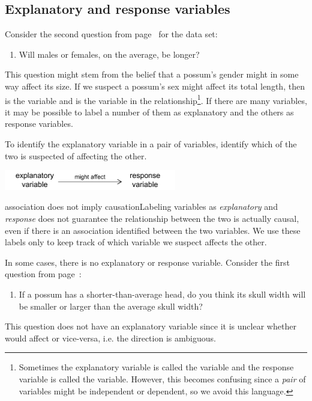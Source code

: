 \subsection{Explanatory and response variables}
\label{explanatoryAndResponse}

Consider the second question from page~\pageref{possibleCausationQuestionForPossums} for the  data set:
\begin{enumerate}
\item[(2)] Will males or females, on the average, be longer?
\end{enumerate}
This question might stem from the belief that a possum's gender might in some way affect its size. If we suspect a possum's sex might affect its total length, then  is the  variable and  is the  variable in the relationship\footnote{Sometimes the explanatory variable is called the  variable and the response variable is called the  variable. However, this becomes confusing since a \emph{pair} of variables might be independent or dependent, so we avoid this language.}. If there are many variables, it may be possible to label a number of them as explanatory and the others as response variables.

\begin{tipBox}{
To identify the explanatory variable in a pair of variables, identify which of the two is suspected of affecting the other.

\hspace{10mm}\includegraphics[height=0.34in]{01/figures/expResp/expResp}}
\end{tipBox}

\begin{caution}{association does not imply causation}{Labeling variables as \emph{explanatory} and \emph{response} does not guarantee the relationship between the two is actually causal, even if there is an association identified between the two variables. We use these labels only to keep track of which variable we suspect affects the other.}
\end{caution}

In some cases, there is no explanatory or response variable. Consider the first question from page~\pageref{possumHeadSizeQuestion}:
\begin{enumerate}
\item[(1)] If a possum has a shorter-than-average head, do you think its skull width will be smaller or larger than the average skull width?
\end{enumerate}
This question does not have an explanatory variable since it is unclear whether  would affect  or vice-versa, i.e. the direction is ambiguous.

